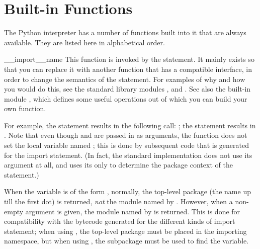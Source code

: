 \section{Built-in Functions}
\label{built-in-funcs}

The Python interpreter has a number of functions built into it that
are always available.  They are listed here in alphabetical order.


\renewcommand{\indexsubitem}{(built-in function)}

\begin{funcdesc}{__import__}{name}
This function is invoked by the  statement.  It
mainly exists so that you can replace it with another
function that has a compatible interface, in order to change the
semantics of the  statement.  For examples of why and
how you would do this, see the standard library modules ,
 and .  See also the built-in module
, which defines some useful operations out of which you can
build your own  function.

For example, the statement  results in the following
call:
;
the statement  results in
.
Note that even though  and \code{['eggs']} are passed
in as arguments, the  function does not set the
local variable named ; this is done by subsequent code that
is generated for the import statement.  (In fact, the standard
implementation does not use its  argument at all, and uses
its  only to determine the package context of the
 statement.)

When the  variable is of the form ,
normally, the top-level package (the name up till the first dot) is
returned, \emph{not} the module named by .  However, when a
non-empty  argument is given, the module named by
 is returned.  This is done for compatibility with the
bytecode generated for the different kinds of import statement; when
using , the top-level package 
must be placed in the importing namespace, but when using , the  subpackage must be used to
find the  variable.
\end{funcdesc}

